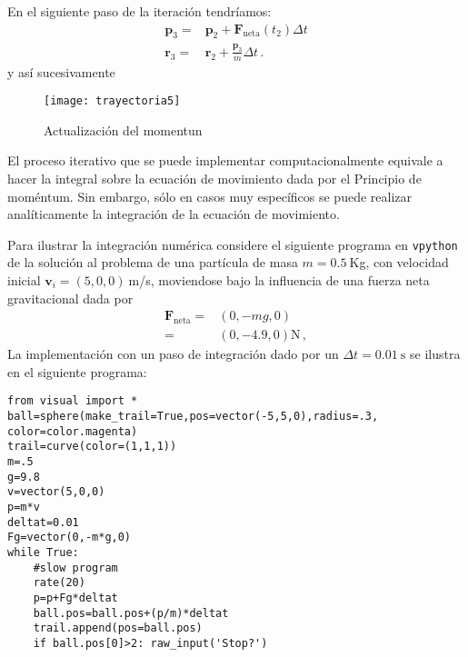 En el siguiente paso de la iteración tendríamos:
\begin{align*}
  \mathbf{p}_3=&\mathbf{p}_2+\mathbf{F}_{\text{neta}}(t_2)\Delta t\nonumber\\
    \mathbf{r}_3=&\mathbf{r}_2+\frac{\mathbf{p}_3}{m}\Delta t\,.
\end{align*}
y así sucesivamente 
\begin{frame}
  \begin{figure}
    \centering
{\texttt{[image: trayectoria5]}}
    \caption{Actualización del momentun}
    \label{fig:predtray}
  \end{figure}
\end{frame}

El proceso iterativo que se puede implementar computacionalmente equivale a hacer la integral sobre la ecuación de movimiento dada por el Principio de moméntum. Sin embargo, sólo en casos muy específicos se puede realizar analíticamente la integración de la ecuación de movimiento.

Para ilustrar la integración numérica considere el siguiente programa en \texttt{vpython} de la solución al problema de una partícula de masa $m=0.5\ $Kg, con velocidad inicial $\mathbf{v}_i=(5,0,0)\ $m/s, moviendose bajo la influencia de una fuerza neta gravitacional dada por
\begin{align}
\textbf{F}_{\text{neta}}=&(0,-mg,0)\nonumber\\
=&(0,-4.9,0)\si{\newton}\,,
\end{align}
La implementación con un paso de integración dado por un $\Delta t=\SI{0.01}{\second}$ se ilustra en el siguiente programa:

\begin{frame}
\begin{lstlisting}
from visual import *
ball=sphere(make_trail=True,pos=vector(-5,5,0),radius=.3, color=color.magenta)
trail=curve(color=(1,1,1))
m=.5
g=9.8
v=vector(5,0,0)
p=m*v
deltat=0.01
Fg=vector(0,-m*g,0)
while True:
    #slow program
    rate(20)
    p=p+Fg*deltat
    ball.pos=ball.pos+(p/m)*deltat
    trail.append(pos=ball.pos)
    if ball.pos[0]>2: raw_input('Stop?')
\end{lstlisting}
\end{frame}

